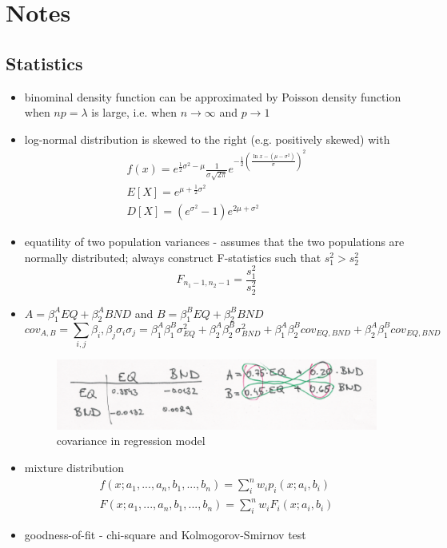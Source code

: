 \chapter{Notes}

\section{Statistics}

\begin{itemize}
\item binominal density function can be approximated by Poisson density function when $np = \lambda$ is large, i.e. when $n \rightarrow \infty$ and $p \rightarrow 1$
\item log-normal distribution is skewed to the right (e.g. positively skewed) with
\begin{gather*}
f(x) = e^{\frac{1}{2}\sigma^2 - \mu} \frac{1}{\sigma \sqrt{2 \pi}} e^{-\frac{1}{2}\left(\frac{\ln x - (\mu - \sigma^2)}{\sigma}\right)^2}\\
E[X] = e^{\mu + \frac{1}{2}\sigma^2}\\
D[X] = (e^{\sigma^2} - 1)e^{2\mu + \sigma^2}
\end{gather*}
\item equatility of two population variances - assumes that the two populations are normally distributed; always construct F-statistics such that $s_1^2 > s_2^2$
\begin{equation*}
F_{n_1 - 1, n_2 - 1} = \frac{s_1^2}{s_2^2}
\end{equation*}
\item $A = \beta_1^A EQ + \beta_2^A BND$ and $B = \beta_1^B EQ + \beta_2^B BND$
\begin{equation*}
cov_{A,B} = \sum_{i,j}\beta_i, \beta_j \sigma_i \sigma_j = \beta_1^A \beta_1^B \sigma_{EQ}^2 + \beta_2^A \beta_2^B \sigma_{BND}^2 + \beta_1^A \beta_2^B cov_{EQ,BND} + \beta_2^A \beta_1^B cov_{EQ,BND}
\end{equation*}
\begin{figure}[htp]
\centering
\includegraphics[scale = 0.75]{reg.eps}
\caption{covariance in regression model}
\label{reg}
\end{figure}
\item mixture distribution
\begin{gather*}
f(x; a_1, ..., a_n, b_1, ..., b_n) = \sum_i^n w_i p_i(x; a_i, b_i)\\
F(x; a_1, ..., a_n, b_1, ..., b_n) = \sum_i^n w_i F_i(x; a_i, b_i)
\end{gather*}
\item goodness-of-fit - chi-square and Kolmogorov-Smirnov test 
\end{itemize}

